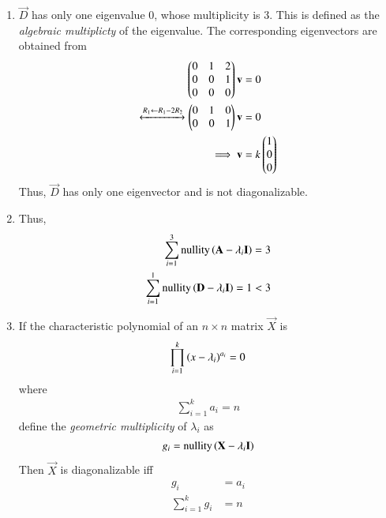 \begin{enumerate}[label=\thesubsection.\arabic*.,ref=\thesubsection.\theenumi]
\item $\vec{D}$ has only one eigenvalue 0, whose multiplicity is 3.  This is defined as the {\em algebraic multiplicty} of the eigenvalue.  The corresponding eigenvectors are obtained from
\begin{align}
\begin{pmatrix}0&1&2\\0&0&1\\0&0&0\end{pmatrix}\mathbf{v} &=0
\\
\xleftrightarrow[]{R_1\leftarrow R_1-2R_2} \begin{pmatrix}0&1&0\\0&0&1\end{pmatrix}\mathbf{v} &= 0
\\
\implies \mathbf{v} &= k\begin{pmatrix}1 \\ 0 \\ 0\end{pmatrix}
\end{align}
%
Thus, $\vec{D}$ has only one eigenvector and is not diagonalizable.
\item Thus, 
\begin{align}
\sum_{i=1}^{3}\text{nullity}\left(\mathbf{A}-\lambda_i\mathbf{I}\right) = 3
\\
\sum_{i=1}^{1}\text{nullity}\left(\mathbf{D}-\lambda_i\mathbf{I}\right) = 1 < 3
\end{align}
%
\item If the characteristic polynomial of an $n \times n$ matrix $\vec{X}$ is
\begin{align}
\prod_{i=1}^{k}\left(x -\lambda_i\right)^{a_i} = 0
\end{align}
where
\begin{align}
\sum_{i=1}^{k}a_i = n
\end{align}
define the {\em geometric multiplicity} of $\lambda_i$ as
\begin{align}
g_i = \text{nullity}\left(\mathbf{X}-\lambda_i\mathbf{I}\right) 
\end{align}
Then $\vec{X}$ is diagonalizable iff
\begin{align}
g_i &= a_i
\\
\sum_{i=1}^{k}g_i &= n
\label{eq:diag_geom_cond}
\end{align}
%
%
\end{enumerate}
